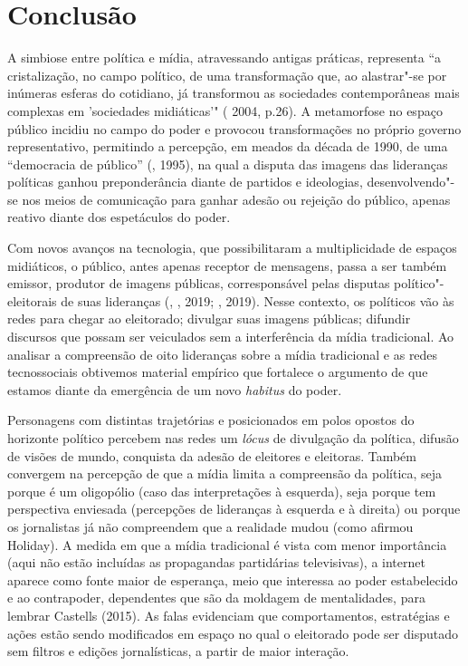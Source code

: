 \section{Conclusão}

A simbiose entre política e mídia, atravessando antigas práticas,
representa ``a cristalização, no campo político, de uma transformação
que, ao alastrar"-se por inúmeras esferas do cotidiano, já transformou as
sociedades contemporâneas mais complexas em 'sociedades midiáticas'"
( 2004, p.26). A metamorfose no espaço público incidiu no campo
do poder e provocou transformações no próprio governo representativo,
permitindo a percepção, em meados da década de 1990, de uma ``democracia
de público'' (, 1995), na qual a disputa das imagens das lideranças
políticas ganhou preponderância diante de partidos e ideologias,
desenvolvendo"-se nos meios de comunicação para ganhar adesão ou rejeição
do público, apenas reativo diante dos espetáculos do poder.

Com novos avanços na tecnologia, que possibilitaram a multiplicidade de
espaços midiáticos, o público, antes apenas receptor de mensagens, passa
a ser também emissor, produtor de imagens públicas, corresponsável pelas
disputas político"-eleitorais de suas lideranças (, ,
2019; , 2019). Nesse contexto, os políticos vão às redes para
chegar ao eleitorado; divulgar suas imagens públicas; difundir discursos
que possam ser veiculados sem a interferência da mídia tradicional. Ao
analisar a compreensão de oito lideranças sobre a mídia tradicional e as
redes tecnossociais obtivemos material empírico que fortalece o
argumento de que estamos diante da emergência de um novo \emph{habitus}
do poder.

Personagens com distintas trajetórias e posicionados em polos opostos do
horizonte político percebem nas redes um \emph{lócus} de divulgação da
política, difusão de visões de mundo, conquista da adesão de eleitores e
eleitoras. Também convergem na percepção de que a mídia limita a
compreensão da política, seja porque é um oligopólio (caso das
interpretações à esquerda), seja porque tem perspectiva enviesada
(percepções de lideranças à esquerda e à direita) ou porque os
jornalistas já não compreendem que a realidade mudou (como afirmou
Holiday). A medida em que a mídia tradicional é vista com menor
importância (aqui não estão incluídas as propagandas partidárias
televisivas), a internet aparece como fonte maior de esperança, meio que
interessa ao poder estabelecido e ao contrapoder, dependentes que são da
moldagem de mentalidades, para lembrar Castells (2015). As falas
evidenciam que comportamentos, estratégias e ações estão sendo
modificados em espaço no qual o eleitorado pode ser disputado sem
filtros e edições jornalísticas, a partir de maior interação.

